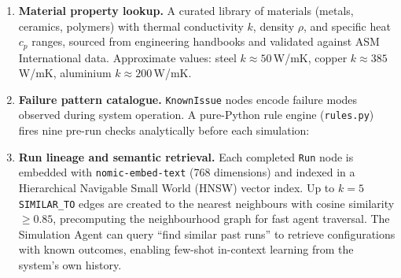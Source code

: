 \documentclass[twocolumn]{article}
\begin{document}
\begin{enumerate}
  \item \textbf{Material property lookup.}  A curated library of materials
        (metals, ceramics, polymers) with thermal conductivity $k$,
        density $\rho$, and specific heat $c_p$ ranges, sourced from
        engineering handbooks and validated against ASM International data.
        Approximate values: steel $k \approx 50$\,W/mK, copper
        $k \approx 385$\,W/mK, aluminium $k \approx 200$\,W/mK.

  \item \textbf{Failure pattern catalogue.}  \texttt{KnownIssue} nodes
        encode failure modes observed during system operation.
        A pure-Python rule engine (\texttt{rules.py}) fires nine
        pre-run checks analytically before each simulation:

        \smallskip\par

  \item \textbf{Run lineage and semantic retrieval.}  Each completed
        \texttt{Run} node is embedded with \texttt{nomic-embed-text}
        (768 dimensions) and indexed in a Hierarchical Navigable Small
        World (HNSW) vector index.  Up to
        $k{=}5$ \texttt{SIMILAR\_TO} edges are created to the nearest
        neighbours with cosine similarity $\ge 0.85$, precomputing the
        neighbourhood graph for fast agent traversal.  The Simulation
        Agent can query ``find similar past runs'' to retrieve configurations
        with known outcomes, enabling few-shot in-context learning from
        the system's own history.
\end{enumerate}
\end{document}
